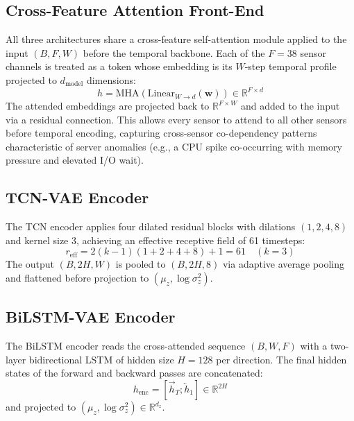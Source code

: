 \documentclass[10pt,twocolumn]{article}
\begin{document}
\subsection{Cross-Feature Attention Front-End}

All three architectures share a cross-feature self-attention module applied to
the input $(B, F, W)$ before the temporal backbone. Each of the $F = 38$ sensor
channels is treated as a token whose embedding is its $W$-step temporal profile
projected to $d_{\text{model}}$ dimensions:
\begin{equation}
  h = \text{MHA}(\text{Linear}_{W \to d}(\mathbf{w})) \in \mathbb{R}^{F \times d}
\end{equation}
The attended embeddings are projected back to $\mathbb{R}^{F \times W}$ and
added to the input via a residual connection. This allows every sensor to attend
to all other sensors before temporal encoding, capturing cross-sensor
co-dependency patterns characteristic of server anomalies (e.g., a CPU spike
co-occurring with memory pressure and elevated I/O wait).

\subsection{TCN-VAE Encoder}

The TCN encoder applies four dilated residual blocks with dilations
$(1, 2, 4, 8)$ and kernel size 3, achieving an effective receptive field of 61
timesteps:
\begin{equation}
  r_{\text{eff}} = 2(k - 1)(1 + 2 + 4 + 8) + 1 = 61 \quad (k=3)
\end{equation}
The output $(B, 2H, W)$ is pooled to $(B, 2H, 8)$ via adaptive average pooling
and flattened before projection to $(\mu_z, \log\sigma_z^2)$.

\subsection{BiLSTM-VAE Encoder}

The BiLSTM encoder reads the cross-attended sequence $(B, W, F)$ with a
two-layer bidirectional LSTM of hidden size $H = 128$ per direction. The final
hidden states of the forward and backward passes are concatenated:
\begin{equation}
  h_{\text{enc}} = [\vec{h}_T; \overleftarrow{h}_1] \in \mathbb{R}^{2H}
\end{equation}
and projected to $(\mu_z, \log\sigma_z^2) \in \mathbb{R}^{d_z}$.
\end{document}
